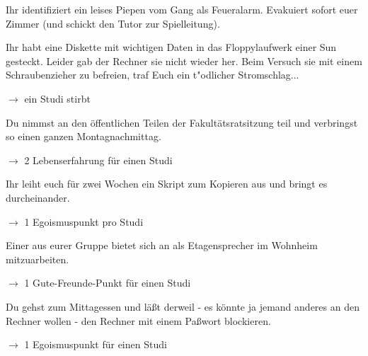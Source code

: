 \documentclass[a4paper,12pt]{article}
\begin{document}
    Ihr identifiziert ein leises Piepen vom Gang als Feueralarm.
    Evakuiert sofort euer Zimmer (und schickt den Tutor zur
    Spielleitung).
    \vspace{10mm}



    Ihr habt eine Diskette mit wichtigen Daten in das Floppylaufwerk
    einer Sun gesteckt. Leider gab der Rechner sie nicht wieder her.
    Beim Versuch sie mit einem Schraubenzieher zu befreien, traf
    Euch ein t"odlicher Stromschlag...

    $\rightarrow$ ein Studi stirbt
    \vspace{10mm}



    Du nimmst an den \"offentlichen Teilen der Fakult\"atsratsitzung
    teil und verbringst so einen ganzen Montagnachmittag.

    $\rightarrow$ 2 Lebenserfahrung f\"ur einen Studi
    \vspace{10mm}



    Ihr leiht euch f\"ur zwei Wochen ein Skript zum Kopieren aus
    und bringt es durcheinander.

    $\rightarrow$ 1 Egoismuspunkt pro Studi
    \vspace{10mm}


    \clearpage


    Einer aus eurer Gruppe bietet sich an als Etagensprecher
    im Wohnheim mitzuarbeiten.

    $\rightarrow$ 1 Gute-Freunde-Punkt f\"ur einen Studi
    \vspace{10mm}



    Du gehst zum Mittagessen und l\"a{\ss}t derweil - es k\"onnte
    ja jemand anderes an den Rechner wollen - den Rechner mit einem
    Pa{\ss}wort blockieren.

    $\rightarrow$ 1 Egoismuspunkt f\"ur einen Studi
    \vspace{10mm}


\end{document}

